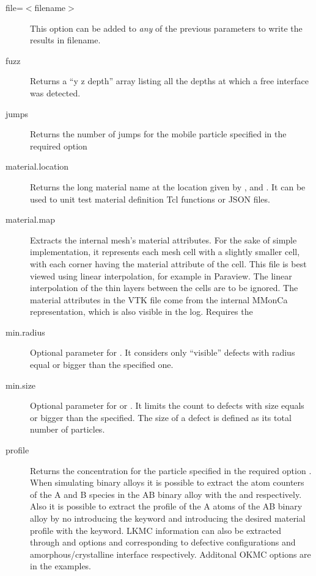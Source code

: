 \begin{description}
\item [file=$<$filename$>$] This option can be added to {\em any} of the previous parameters to write the results in filename.

\item [fuzz] Returns a ``y z depth'' array listing all the depths at which a free interface was detected.

\item [jumps] Returns the number of jumps for the mobile particle specified in the required option 

\item [material.location] Returns the long material name at the location given by ,  and . It can be used to unit test material definition Tcl functions or JSON files.

\item [material.map] Extracts the internal mesh's material attributes. For the sake of simple implementation, it represents each mesh cell with a slightly smaller cell, with each corner having the material attribute of the cell. This file is best viewed using linear interpolation, for example in Paraview. The linear interpolation of the thin layers between the cells are to be ignored. The material attributes in the VTK file come from the internal MMonCa representation, which is also visible in the log. Requires the 

\item [min.radius] Optional parameter for . It considers only ``visible'' defects with radius equal or bigger than the specified one.

\item [min.size] Optional parameter for  or . It limits the count to defects with size equals or bigger than the specified. The size of a defect is defined as its total number of particles.

\item [profile] Returns the concentration for the particle specified in the required option . When simulating binary alloys it is possible to extract the atom counters of the A and B species in the AB binary alloy with the  and  respectively. Also it is possible to extract the profile of the A atoms of the AB binary alloy by no introducing the  keyword and introducing the desired material profile with the  keyword. LKMC information can also be extracted through  and  options and corresponding to defective configurations and amorphous/crystalline interface respectively. Additonal OKMC options are in the examples.


\end{description}
